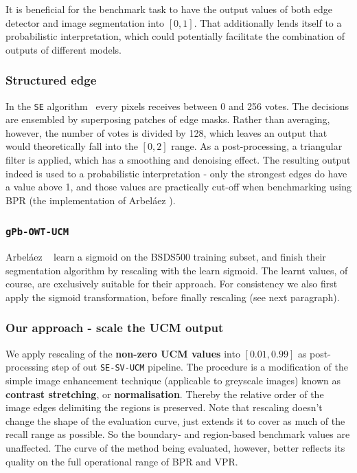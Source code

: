 It is beneficial %
for the benchmark task to have the output values of both edge detector and image segmentation into $[0,1]$. That additionally lends itself to a probabilistic interpretation, which could potentially facilitate the combination of outputs of different models. %

\subsubsection{Structured edge}
In the {\tt SE} algorithm~\cite{DollarICCV13edges,Dollar2015PAMI} every pixels receives between 0 and 256 votes. The decisions are ensembled by superposing patches of edge masks. Rather than averaging, however, the number of votes is divided by 128, which leaves an output that would theoretically fall into the $[0, 2]$ range. As a post-processing, a triangular filter is applied, which has a smoothing and denoising effect. The resulting output indeed is used to %
a probabilistic interpretation - only the strongest edges do have a value above 1, and those values are practically cut-off when benchmarking using BPR (the implementation of Arbel\'aez \etal).

\subsubsection{{\tt gPb-OWT-UCM}}
Arbel\'aez \etal~\cite{Arbelaez11} learn a sigmoid on the BSDS500 training subset, and finish their segmentation algorithm by rescaling with the learn sigmoid. The learnt values, of course, are exclusively suitable for their approach. For consistency we also first apply the sigmoid transformation, before finally rescaling (see next paragraph).

\subsubsection{Our approach - scale the UCM output} %
We apply rescaling of the {\bf non-zero UCM values} into $[0.01, 0.99]$ as post-processing step of out {\tt SE-SV-UCM} pipeline. The procedure is a modification of the simple image enhancement technique (applicable to greyscale images) known as {\bf contrast stretching}, or {\bf normalisation}. Thereby the relative order of the image edges delimiting the regions is preserved. Note that rescaling doesn't change the shape of the evaluation curve, just extends it to cover as much of the recall range as possible. So the boundary- and region-based benchmark values are unaffected. The curve of the method being evaluated, however, better reflects its quality on the full operational range of BPR and VPR.

